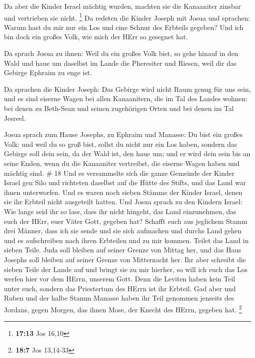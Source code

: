  Da aber die Kinder Israel mächtig wurden, machten sie die
Kanaaniter zinsbar und vertrieben sie nicht. \footnote{\textbf{17:13}
  Jos 16,10}  Da redeten die Kinder Joseph mit Josua und
sprachen: Warum hast du mir nur ein Los und eine Schnur des Erbteils
gegeben? Und ich bin doch ein großes Volk, wie mich der HErr so gesegnet
hat.

 Da sprach Josua zu ihnen: Weil du ein großes Volk bist, so
gehe hinauf in den Wald und haue um daselbst im Lande die Pheresiter und
Riesen, weil dir das Gebirge Ephraim zu enge ist.

 Da sprachen die Kinder Joseph: Das Gebirge wird nicht Raum
genug für uns sein, und es sind eiserne Wagen bei allen Kanaanitern, die
im Tal des Landes wohnen: bei denen zu Beth-Sean und seinen zugehörigen
Orten und bei denen im Tal Jesreel.

 Josua sprach zum Hause Josephs, zu Ephraim und Manasse: Du
bist ein großes Volk; und weil du so groß bist, sollst du nicht nur ein
Los haben,  sondern das Gebirge soll dein sein, da der Wald
ist, den haue um; und er wird dein sein bis an seine Enden, wenn du die
Kanaaniter vertreibst, die eiserne Wagen haben und mächtig sind. \# 18
 Und es versammelte sich die ganze Gemeinde der Kinder
Israel gen Silo und richteten daselbst auf die Hütte des Stifts, und das
Land war ihnen unterworfen.  Und es waren noch sieben Stämme
der Kinder Israel, denen sie ihr Erbteil nicht ausgeteilt hatten.
 Und Josua sprach zu den Kindern Israel: Wie lange seid ihr
so lass, dass ihr nicht hingeht, das Land einzunehmen, das euch der
HErr, euer Väter Gott, gegeben hat?  Schafft euch aus
jeglichem Stamm drei Männer, dass ich sie sende und sie sich aufmachen
und durchs Land gehen und es aufschreiben nach ihren Erbteilen und zu
mir kommen.  Teilet das Land in sieben Teile. Juda soll
bleiben auf seiner Grenze von Mittag her, und das Haus Josephs soll
bleiben auf seiner Grenze von Mitternacht her.  Ihr aber
schreibt die sieben Teile der Lande auf und bringt sie zu mir hierher,
so will ich euch das Los werfen hier vor dem HErrn, unserem Gott.
 Denn die Leviten haben kein Teil unter euch, sondern das
Priestertum des HErrn ist ihr Erbteil. Gad aber und Ruben und der halbe
Stamm Manasse haben ihr Teil genommen jenseits des Jordans, gegen
Morgen, das ihnen Mose, der Knecht des HErrn, gegeben hat. \footnote{\textbf{18:7}
  Jos 13,14-33}

